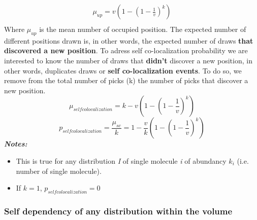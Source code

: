 \documentclass{article}
\begin{document}
\begin{equation}
    \begin{split}
    \mu_{up} = v(1-{(1-\frac{1}{v})}^k) \\
    \end{split}
\end{equation}
Where $\mu_{up}$ is the mean number of occupied position.
The expected number of different positions drawn is, in other words, the expected number of draws \textbf{that discovered a new position}.
To adress self co-localization probability we are interested to know the number of draws that \textbf{didn't} discover a new position,
in other words, duplicates draws or \textbf{self co-localization events}. To do so, we remove from the total number of picks (k) the
number of picks that discover a new position.
\[
\mu_{self colocalization} = k - v(1-(1-\frac{1}{v})^k)
\]
\begin{equation}
p_{self colocalization}  = \frac{\mu_{sc}}{k} = 1 - \frac{v}{k}(1-{(1-\frac{1}{v})}^k)
\end{equation}
\textit{\textbf{Notes:}}
\begin{itemize}
    \item This is true for any distribution \textit{I} of single molecule \textit{i} of abundancy $ k_i $ (i.e. number of single molecule).
    \item If $k = 1$, $p_{self colocalization} = 0$
\end{itemize}

\subsubsection{Self dependency of any distribution within the volume}
\end{document}

